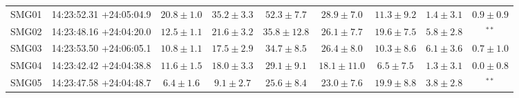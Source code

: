 \documentclass[twocolumn,traditabstract]{aa}
\begin{document}
\begin{table}[h]
\begin{center}
\begin{tabular}{ccccccccc}
SMG01 & 14:23:52.31 +24:05:04.9 & $    20.8 \pm      1.0$ & $    35.2 \pm      3.3$ & $    52.3 \pm      7.7$ & $    28.9 \pm      7.0$ & $    11.3 \pm      9.2$ & $     1.4 \pm      3.1$ & $     0.9 \pm      0.9$ \\
SMG02 & 14:23:48.16 +24:04:20.0 & $    12.5 \pm      1.1$ & $    21.6 \pm      3.2$ & $    35.8 \pm     12.8$ & $    26.1 \pm      7.7$ & $    19.6 \pm      7.5$ & $     5.8 \pm      2.8$ & $^{**}$ \\
SMG03 & 14:23:53.50 +24:06:05.1 & $    10.8 \pm      1.1$ & $    17.5 \pm      2.9$ & $    34.7 \pm      8.5$ & $    26.4 \pm      8.0$ & $    10.3 \pm      8.6$ & $     6.1 \pm      3.6$ & $     0.7 \pm      1.0$ \\
SMG04 & 14:23:42.42 +24:04:38.8 & $    11.6 \pm      1.5$ & $    18.0 \pm      3.3$ & $    29.1 \pm      9.1$ & $    18.1 \pm     11.0$ & $     6.5 \pm      7.5$ & $     1.3 \pm      3.1$ & $     0.0 \pm      0.8$ \\
SMG05 & 14:23:47.58 +24:04:48.7 & $     6.4 \pm      1.6$ & $     9.1 \pm      2.7$ & $    25.6 \pm      8.4$ & $    23.0 \pm      7.6$ & $    19.9 \pm      8.8$ & $     3.8 \pm      2.8$ & $^{**}$ \\

\end{tabular}
\end{center}
\end{table}
\end{document}
